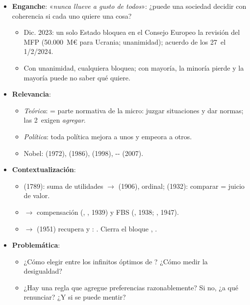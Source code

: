\documentclass{article}
\begin{document}
\cabecerarepaso
\begin{columnas}

\begin{itemize}
\item \textbf{Enganche}: «\emph{nunca llueve a gusto de todos}»: ¿puede una sociedad decidir con coherencia si cada uno quiere una cosa?
  \begin{itemize}
  \item Dic. 2023: un solo Estado bloquea en el Consejo Europeo la revisión del MFP (50.000~M€ para Ucrania; unanimidad); acuerdo de los 27~el 1/2/2024.
  \item Con unanimidad, cualquiera bloquea; con mayoría, la minoría pierde y la mayoría puede no saber qué quiere.
  \end{itemize}
\item \textbf{Relevancia}:
  \begin{itemize}
  \item \emph{Teórica}:  = parte normativa de la micro: juzgar situaciones y dar normas; las 2~exigen \emph{agregar}.
  \item \emph{Política}: toda política mejora a unos y empeora a otros.
  \item Nobel:  (1972),  (1986),  (1998), -- (2007).
  \end{itemize}
\item \textbf{Contextualización}:
  \begin{itemize}
  \item {} (1789): suma de utilidades $\to$  (1906), ordinal;  (1932): comparar = juicio de valor.
  \item $\to$ compensación (, , 1939) y FBS (, 1938; , 1947).
  \item $\to$  (1951) recupera  y : . Cierra el bloque , .
  \end{itemize}
\item \textbf{Problemática}:
  \begin{itemize}
  \item ¿Cómo elegir entre los infinitos óptimos de ? ¿Cómo medir la desigualdad?
  \item ¿Hay una regla que agregue preferencias razonablemente? Si no, ¿a qué renunciar? ¿Y si se puede mentir?

\end{itemize}
\end{itemize}
\end{columnas}
\end{document}
